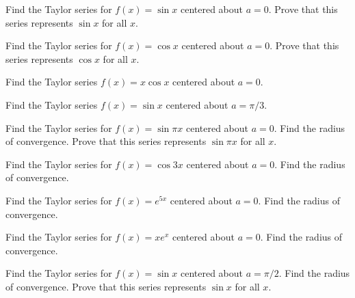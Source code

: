 \begin{exercise}
Find the Taylor series for $f(x) = \sin x$ centered about $a = 0$. Prove that this series represents $\sin x$ for all $x$.
\end{exercise}

\begin{exercise}
Find the Taylor series for $f(x) = \cos x$ centered about $a = 0$. Prove that this series represents $\cos x$ for all $x$.
\end{exercise}

\begin{exercise}
Find the Taylor series $f(x) = x \cos x$ centered about $a = 0$.
\end{exercise}

\begin{exercise}
Find the Taylor series $f(x) = \sin x$ centered about $a = \pi/3$.
\end{exercise}

\begin{exercise}
Find the Taylor series for $f(x) = \sin \pi x$ centered about $a = 0$. Find the radius of convergence. Prove that this series represents $\sin \pi x$ for all $x$.
\end{exercise}

\begin{exercise}
Find the Taylor series for $f(x) = \cos 3x$ centered about $a = 0$. Find the radius of convergence.
\end{exercise}

\begin{exercise}
Find the Taylor series for $f(x) = e^{5x}$ centered about $a = 0$. Find the radius of convergence.
\end{exercise}

\begin{exercise}
Find the Taylor series for $f(x) = xe^{x}$ centered about $a = 0$. Find the radius of convergence.
\end{exercise}

\begin{exercise}
Find the Taylor series for $f(x) = \sin x$ centered about $a = \pi/2$. Find the radius of convergence. Prove that this series represents $\sin x$ for all $x$.
\end{exercise}

